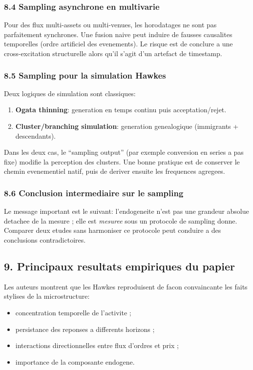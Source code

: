 \documentclass[11pt,a4paper]{article}
\begin{document}
\subsubsection*{8.4 Sampling asynchrone en multivarie}
Pour des flux multi-assets ou multi-venues, les horodatages ne sont pas parfaitement synchrones. Une fusion naive peut induire de fausses causalites temporelles (ordre artificiel des evenements). Le risque est de conclure a une cross-excitation structurelle alors qu'il s'agit d'un artefact de timestamp.

\subsubsection*{8.5 Sampling pour la simulation Hawkes}
Deux logiques de simulation sont classiques:
\begin{enumerate}[leftmargin=1.2cm]
    \item \textbf{Ogata thinning}: generation en temps continu puis acceptation/rejet.
    \item \textbf{Cluster/branching simulation}: generation genealogique (immigrants + descendants).
\end{enumerate}

Dans les deux cas, le \enquote{sampling output} (par exemple conversion en series a pas fixe) modifie la perception des clusters. Une bonne pratique est de conserver le chemin evenementiel natif, puis de deriver ensuite les frequences agregees.

\subsubsection*{8.6 Conclusion intermediaire sur le sampling}
Le message important est le suivant: l'endogeneite n'est pas une grandeur absolue detachee de la mesure ; elle est \emph{mesuree} sous un protocole de sampling donne. Comparer deux etudes sans harmoniser ce protocole peut conduire a des conclusions contradictoires.

\subsection*{9. Principaux resultats empiriques du papier}

Les auteurs montrent que les Hawkes reproduisent de facon convaincante les faits stylises de la microstructure:
\begin{itemize}[leftmargin=1.2cm]
    \item concentration temporelle de l'activite ;
    \item persistance des reponses a differents horizons ;
    \item interactions directionnelles entre flux d'ordres et prix ;
    \item importance de la composante endogene.
\end{itemize}
\end{document}
